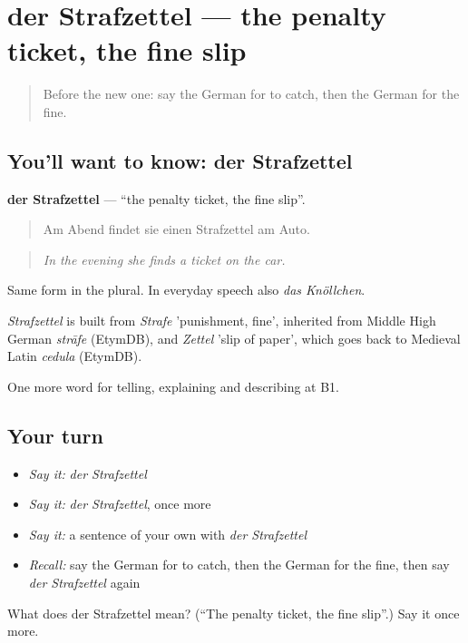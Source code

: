 \section[der Strafzettel]{der Strafzettel — the penalty ticket, the fine slip}

\label{lesson:GE-C407-strafzettel}



\begin{quote}
Before the new one: say the German for to catch, then the German for the fine.
\end{quote}

\subsection*{You'll want to know: der Strafzettel}
\textbf{der Strafzettel} — \textquotedblleft{}the penalty ticket, the fine slip\textquotedblright{}.

\begin{quote}
Am Abend findet sie einen Strafzettel am Auto.
\end{quote}

\begin{quote}
\emph{In the evening she finds a ticket on the car.}
\end{quote}

Same form in the plural. In everyday speech also \emph{das Knöllchen}.

\begin{cousinweb}
\emph{Strafzettel} is built from \emph{Strafe} 'punishment, fine', inherited from Middle High German \emph{strāfe} (EtymDB), and \emph{Zettel} 'slip of paper', which goes back to Medieval Latin \emph{cedula} (EtymDB).
\end{cousinweb}

\begin{grammarlens}[title={What you've built}]
One more word for telling, explaining and describing at B1.
\end{grammarlens}

\subsection*{Your turn}
\begin{itemize}
\raggedright
  \item \emph{Say it:} \emph{der Strafzettel}
  \item \emph{Say it:} \emph{der Strafzettel}, once more
  \item \emph{Say it:} a sentence of your own with \emph{der Strafzettel}
  \item \emph{Recall:} say the German for to catch, then the German for the fine, then say \emph{der Strafzettel} again
\end{itemize}

\begin{tcolorbox}[breakable,colback=teal!4,colframe=teal!35!black,title={Before you move on}]
What does der Strafzettel mean? (\textquotedblleft{}The penalty ticket, the fine slip\textquotedblright{}.) Say it once more.
\end{tcolorbox}
